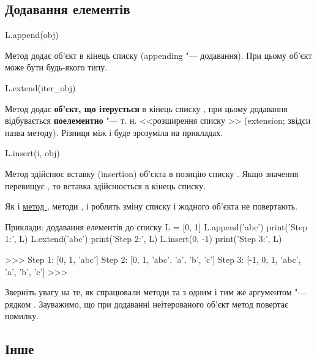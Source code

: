 \subsection{Додавання елементів}

\begin{pydef}
L.append(obj)
\end{pydef}

Метод  додає об'єкт  в кінець списку  (appending "--- додавання). При цьому об'єкт  може бути будь-якого типу.

\begin{pydef}
L.extend(iter_obj)
\end{pydef}

Метод  додає \textbf{об'єкт, що ітерується}  в кінець списку , при цьому додавання відбувається \textbf{поелементно} "--- т. н. <<розширення списку >> (extension; звідси назва методу). Різниця між  і  буде зрозуміла на прикладах.

\begin{pydef}
L.insert(i, obj)
\end{pydef}

Метод  здійснює вставку (insertion) об'єкта  в позицію  списку . Якщо значення  перевищує , то вставка здійснюється в кінець списку.

Як і \hyperref[remove]{метод }, методи ,  і  роблять зміну списку  і жодного об'єкта не повертають.

\begin{pyr}{}
\begin{py}{Приклади: додавання елементів до списку}
L = [0, 1]
L.append('abc')
print('Step 1:', L)
L.extend('abc')
print('Step 2:', L)
L.insert(0, -1)
print('Step 3:', L)
\end{py}
\tcblower
\begin{py}{}
>>>
Step 1: [0, 1, 'abc']
Step 2: [0, 1, 'abc', 'a', 'b', 'c']
Step 3: [-1, 0, 1, 'abc', 'a', 'b', 'c']
>>>
\end{py}
\end{pyr}
\noindent Зверніть увагу на те, як спрацювали методи  та  з одним і тим же аргументом "--- рядком . Зауважимо, що при додаванні неітерованого об'єкт метод  повертає помилку.

\subsection{Інше}

